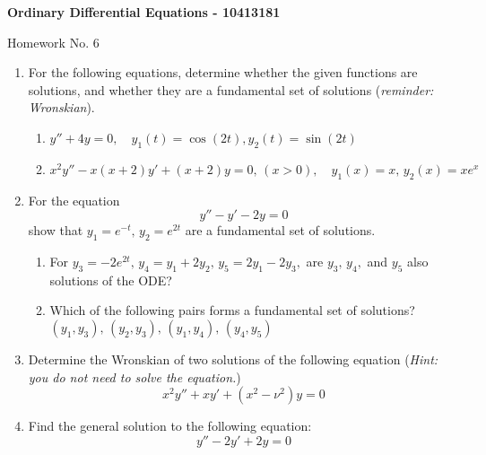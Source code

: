 \documentclass[10pt,a4paper]{letter}
\begin{document}
\begin{center}
\begin{Large}
\textbf{Ordinary Differential Equations - 10413181}\\
\end{Large}
\vspace{1em}
\begin{large}Homework No. 6\end{large}
\end{center}

\begin{enumerate}
\item For the following equations, determine whether the given functions are solutions, and whether they are a fundamental set of solutions (\emph{reminder: Wronskian}).
\begin{enumerate}
\item $ y'' + 4y = 0, \quad y_1(t) = \cos(2t), y_2(t) = \sin(2t)$
\item $ x^2 y'' - x(x+2)y' + (x+2)y = 0, \, (x>0), \quad y_1(x) = x, \, y_2(x) = xe^{x}$
\end{enumerate} 
\item For the equation
\[ y'' - y' - 2y = 0 \]
show that $y_1 = e^{-t}, \, y_2 = e^{2t}$ are a fundamental set of solutions.
\begin{enumerate}
\item For $y_3 = -2 e^{2t}, \, y_4 = y_1 +2y_2, \, y_5 = 2y_1 - 2y_3,$ are $y_3, \, y_4,$ and $y_5$ also solutions of the ODE?
\item Which of the following pairs forms a fundamental set of solutions?\\
 $(y_1,y_3),\, (y_2,y_3), \, (y_1,y_4), \, (y_4,y_5)$
\end{enumerate}
\item Determine the Wronskian of two solutions of the following equation (\emph{Hint: you do not need to solve the equation.})
\[ x^2 y'' + xy' + (x^2 - \nu^2)y = 0 \]
\item Find the general solution to the following equation:
\[ y'' - 2y' + 2y = 0 \]
\end{enumerate}
\end{document}
